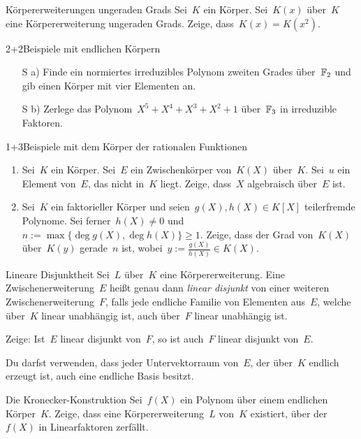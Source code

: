 \documentclass{algblatt}
\begin{document}

\begin{aufgabe}{4}{Körpererweiterungen ungeraden Grads}
Sei~$K$ ein Körper. Sei~$K(x)$ über~$K$ eine Körpererweiterung ungeraden Grads. Zeige,
dass~$K(x) = K(x^2)$.
\end{aufgabe}

\begin{aufgabe}{2+2}{Beispiele mit endlichen Körpern}
\begin{enumerate}
\item[S a)]
Finde ein normiertes irreduzibles Polynom zweiten Grades über~$\mathbb{F}_2$ und gib
einen Körper mit vier Elementen an.
\item[S b)] Zerlege das Polynom~$X^5 + X^4 + X^3 + X^2 + 1$ über~$\mathbb{F}_3$ in
irreduzible Faktoren.
\end{enumerate}
\end{aufgabe}

\begin{aufgabe}{1+3}{Beispiele mit dem Körper der rationalen Funktionen}
\begin{enumerate}
\item Sei~$K$ ein Körper. Sei~$E$ ein Zwischenkörper von~$K(X)$ über~$K$.
Sei~$u$ ein Element von~$E$, das nicht in~$K$ liegt. Zeige, dass~$X$
algebraisch über~$E$ ist.
\item Sei~$K$ ein faktorieller Körper und seien~$g(X), h(X) \in K[X]$ teilerfremde Polynome.
Sei ferner~$h(X) \neq 0$ und~$n := \max\{ \deg g(X), \deg h(X) \} \geq 1$.
Zeige, dass der Grad von~$K(X)$ über~$K(y)$ gerade~$n$ ist, wobei~$y :=
\tfrac{g(X)}{h(X)} \in K(X)$.
\end{enumerate}
\end{aufgabe}

\begin{aufgabe}{4}{Lineare Disjunktheit}
Sei~$L$ über~$K$ eine Körpererweiterung. Eine Zwischenerweiterung~$E$ heißt
genau dann \emph{linear disjunkt} von einer weiteren Zwischenerweiterung~$F$,
falls jede endliche Familie von Elementen aus~$E$, welche über~$K$ linear
unabhängig ist, auch über~$F$ linear unabhängig ist.

Zeige: Ist~$E$ linear disjunkt von~$F$, so ist auch~$F$ linear disjunkt von~$E$.

Du darfst verwenden, dass jeder Untervektorraum von~$E$, der über~$K$ endlich
erzeugt ist, auch eine endliche Basis besitzt.
\end{aufgabe}

\begin{aufgabe}{4}{Die Kronecker-Konstruktion}
Sei~$f(X)$ ein Polynom über einem endlichen Körper~$K$. Zeige, dass eine
Kör\-per\-erwei\-te\-rung~$L$ von~$K$ existiert, über der~$f(X)$ in Linearfaktoren
zerfällt.
\end{aufgabe}
\end{document}
